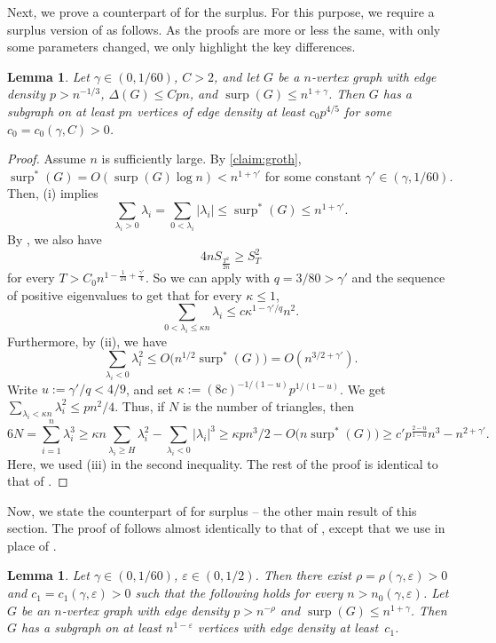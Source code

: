 \documentclass[11pt]{article}
\theoremstyle{plain}
\newtheorem{lemma}[theorem]{Lemma}
\theoremstyle{definition}
\DeclareMathOperator{\surp}{surp}
\newcommand{\eps}{\varepsilon}
\begin{document}
Next, we prove a counterpart of  for the surplus.
For this purpose, we require a surplus version of  as follows.
As the proofs are more or less the same, with only some parameters changed, we only highlight the key differences.
\begin{lemma}\label{lemma:dens1_triangle_count_surplus}
    Let $\gamma\in (0,1/60)$, $C>2$, and let $G$ be a $n$-vertex graph with  edge density $p>n^{-1/3}$, $\Delta(G)\leq Cpn$, and $\surp(G)\leq n^{1+\gamma}$. 
    Then $G$ has a subgraph on at least $pn$ vertices of edge density at least $c_0 p^{4/5}$ for some $c_0=c_0(\gamma,C)>0$.
\end{lemma}
\begin{proof}
    Assume $n$ is sufficiently large.
    By \cref{claim:groth}, $\surp^*(G) = O(\surp(G)\log n) < n^{1+\gamma'}$ for some constant $\gamma' \in (\gamma,1/60)$.
    Then,  (i) implies
    $$\sum_{\lambda_i>0}\lambda_i= \sum_{0<\lambda_i}|\lambda_i|\leq \surp^*(G)\leq n^{1+\gamma'}.$$
    By , we also have
    $$4nS_{\frac{T^2}{2n}}\geq S_T^2$$
    for every $T>C_0n^{1-\frac{1}{24}+\frac{\gamma'}{4}}$.
    So we can apply  with $q=3/80>\gamma'$ and the sequence of positive eigenvalues to get that for every $\kappa \leq 1$,
    $$\sum_{0<\lambda_i\leq \kappa n}\lambda_i\leq c\kappa^{1-\gamma'/q}n^{2}.$$
    Furthermore, by  (ii), we have
    $$\sum_{\lambda_i<0}\lambda_i^2\leq O\big(n^{1/2}\surp^*(G) \big)=O(n^{3/2+\gamma'}).$$
    Write $u:=\gamma'/q<4/9$, and set $\kappa:=(8c)^{-1/(1-u)}p^{1/(1-u)}$.
    We get $\sum_{\lambda_i<\kappa n}\lambda_i^2\leq pn^{2}/4$.
    Thus, if $N$ is the number of triangles, then
    $$6N=\sum_{i=1}^n\lambda_i^3\geq \kappa n\sum_{\lambda_i\geq H}\lambda_i^2-\sum_{\lambda_i<0}|\lambda_i|^3\geq \kappa pn^3/2-O\big(n\surp^*(G) \big)\geq c'p^{\frac{2-u}{1-u}}n^{3}-n^{2+\gamma'}.$$
    Here, we used  (iii) in the second inequality.
    The rest of the proof is identical to that of .
\end{proof}

Now, we state the counterpart of  for surplus -- the other main result of this section.
The proof of  follows almost identically to that of , except that we use  in place of .
\begin{lemma}\label{lemma:dens1_main_surplus}
    Let $\gamma\in (0,1/60)$, $\eps\in (0,1/2)$.
    Then there exist $\rho=\rho(\gamma,\eps)>0$ and $c_1=c_1(\gamma,\eps)>0$ such that the following holds for every $n>n_0(\gamma,\eps)$. 
    Let $G$ be an $n$-vertex graph with edge density $p>n^{-\rho}$ and $\surp(G)\leq n^{1+\gamma}$.
    Then $G$ has a subgraph on at least $n^{1-\eps}$ vertices with edge density at least~$c_1$.
\end{lemma}
\end{document}
